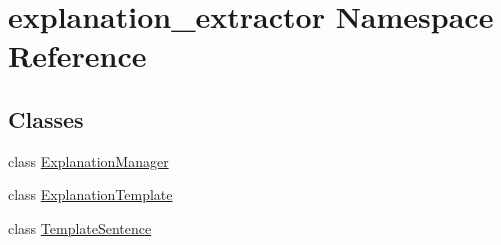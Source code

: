\hypertarget{namespaceexplanation__extractor}{}\section{explanation\+\_\+extractor Namespace Reference}
\label{namespaceexplanation__extractor}
\subsection*{Classes}
\begin{DoxyCompactItemize}
\item 
class \hyperlink{classexplanation__extractor_1_1_explanation_manager}{Explanation\+Manager}
\item 
class \hyperlink{classexplanation__extractor_1_1_explanation_template}{Explanation\+Template}
\item 
class \hyperlink{classexplanation__extractor_1_1_template_sentence}{Template\+Sentence}
\end{DoxyCompactItemize}
